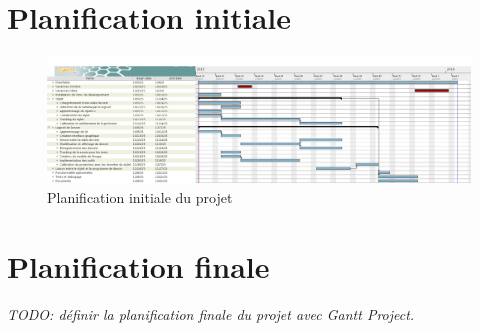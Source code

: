 \documentclass[11pt,a4paper,oldfontcommands]{memoir}
\begin{document}
\section{Planification initiale}

\begin{figure}[H]
\centering
\includegraphics[angle=90, scale=0.35]{images/planification.png}
\caption{Planification initiale du projet}
\end{figure}

\newpage

\section{Planification finale}

\textit{TODO: définir la planification finale du projet avec Gantt Project.}
\end{document}
